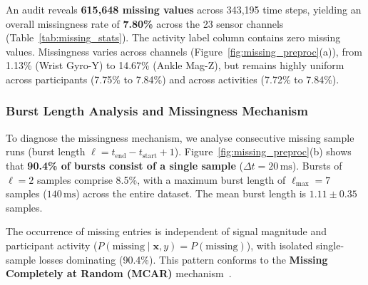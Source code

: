 \documentclass[10pt,twocolumn]{article}
\begin{document}
An audit reveals \textbf{615,648 missing values} across 343,195 time steps, yielding an overall missingness rate of \textbf{7.80\%} across the 23 sensor channels (Table~\ref{tab:missing_stats}). The activity label column contains zero missing values. Missingness varies across channels (Figure~\ref{fig:missing_preproc}(a)), from 1.13\% (Wrist Gyro-Y) to 14.67\% (Ankle Mag-Z), but remains highly uniform across participants (7.75\% to 7.84\%) and across activities (7.72\% to 7.84\%).

\subsubsection{Burst Length Analysis and Missingness Mechanism}
To diagnose the missingness mechanism, we analyse consecutive missing sample runs (burst length $\ell = t_{\text{end}} - t_{\text{start}} + 1$). Figure~\ref{fig:missing_preproc}(b) shows that \textbf{90.4\% of bursts consist of a single sample} ($\Delta t = 20\,\text{ms}$). Bursts of $\ell = 2$ samples comprise 8.5\%, with a maximum burst length of $\ell_{\max} = 7$ samples ($140\,\text{ms}$) across the entire dataset. The mean burst length is $1.11 \pm 0.35$ samples.

The occurrence of missing entries is independent of signal magnitude and participant activity ($P(\text{missing} \mid \mathbf{x}, y) = P(\text{missing})$), with isolated single-sample losses dominating (90.4\%). This pattern conforms to the \textbf{Missing Completely at Random (MCAR)} mechanism~\cite{little2019statistical}.

\begin{table}[t]
\centering
\caption{Missing data audit per anatomical sensor cluster and burst characteristics before and after preprocessing.}
\label{tab:missing_stats}
\end{table}
\end{document}

